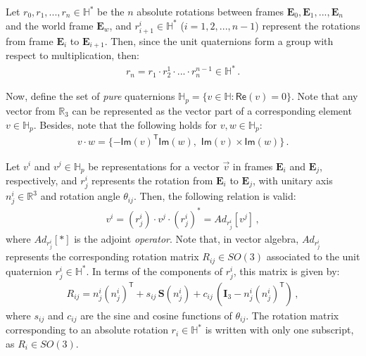 Let $r_0, r_1, ... , r_n \in \mathbb{H}^*$ be the $n$ absolute rotations between frames $\mathbf{E}_0, \mathbf{E}_1, ..., \mathbf{E}_n$ and the world frame $\mathbf{E}_w$, and $r^i_{i+1} \in \mathbb{H}^*$ ($i=1,2,...,n-1$) represent the rotations from frame $\mathbf{E}_i$ to $\mathbf{E}_{i+1}$.
Then, since the unit quaternions form a group with respect to multiplication, then:
%
\begin{align}
r_n = r_1 \cdot r^1_2 \cdot ... \cdot r^{n-1}_n \in \mathbb{H}^* \,.
\end{align}

Now, define the set of \textit{pure} quaternions $\mathbb{H}_p = \{ v \in \mathbb{H}: \mathsf{Re}(v) = 0 \}$.
%
Note that any vector from $\mathbb{R}_3$ can be represented as the vector part of a corresponding element $v \in \mathbb{H}_p$.
%
Besides, note that the following holds for $v,w \in \mathbb{H}_p$:
\begin{align}
%
v \cdot w = \{ -\mathsf{Im}(v)^\mathsf{T} \mathsf{Im}(w) ,\,\, \mathsf{Im}(v) \times \mathsf{Im}(w) \} \,.
%
\end{align}
%

Let $v^i$ and $v^j \!\in\! \mathbb{H}_p$ be representations for a vector $\vec{v}$ in frames $\mathbf{E}_i$ and $\mathbf{E}_j$, respectively, and $r^i_j$ represents the rotation from $\mathbf{E}_i$ to $\mathbf{E}_j$, with unitary axis $n^i_{j} \in \mathbb{R}^3$ and rotation angle $\theta_{ij}$.
%
Then, the following relation is valid:
%
\begin{align}
v^i = (r^i_j) \cdot v^j \cdot (r^i_j)^* = Ad_{r^i_j} \left[ v^j \right] \,,
\end{align}
%
where $Ad_{r^i_j}[*]$ is the adjoint {\it operator}.
%
Note that, in vector algebra, $Ad_{r^i_j}$ represents the corresponding rotation matrix $R_{ij} \in SO(3)$ associated to the unit quaternion $r^i_j \in \mathbb{H}^*$.
%
In terms of the components of $r^i_j$, this matrix is given by:
%
\begin{align}
R_{ij} = n^i_{j} (n^i_{j})^\mathsf{T} + s_{ij} \, \mathbf{S}(n^i_{j}) + c_{ij} \, (\mathbf{I}_3 - n^i_{j} (n^i_{j})^\mathsf{T}) \,,
\label{eq:quaternion_rotation_matrix}
\end{align}
%
where $s_{ij}$ and $c_{ij}$ are the sine and cosine functions of $\theta_{ij}$.
The rotation matrix corresponding to an absolute rotation $r_i \in \mathbb{H}^*$ is written with only one subscript, as $R_i \in SO(3)$.

